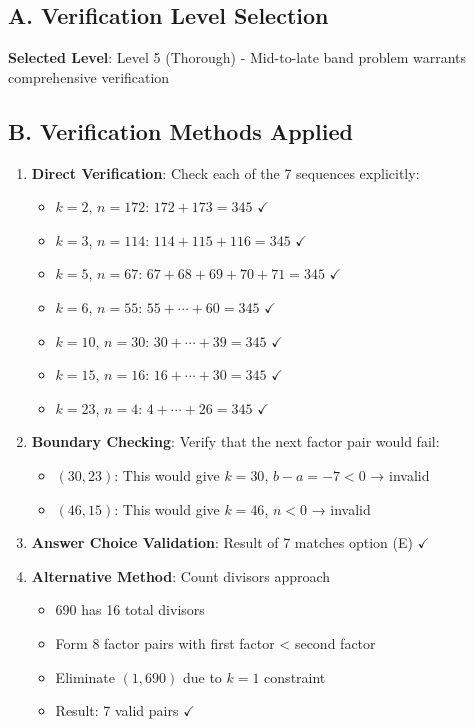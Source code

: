 \documentclass[11pt]{article}
\begin{document}
\begin{verificationbox}
\subsection*{A. Verification Level Selection}
\textbf{Selected Level}: Level 5 (Thorough) - Mid-to-late band problem warrants comprehensive verification

\subsection*{B. Verification Methods Applied}
\begin{enumerate}[leftmargin=*]
    \item \textbf{Direct Verification}: Check each of the 7 sequences explicitly:
    \begin{itemize}
        \item $k=2$, $n=172$: $172 + 173 = 345$ $\checkmark$
        \item $k=3$, $n=114$: $114 + 115 + 116 = 345$ $\checkmark$
        \item $k=5$, $n=67$: $67 + 68 + 69 + 70 + 71 = 345$ $\checkmark$
        \item $k=6$, $n=55$: $55 + \cdots + 60 = 345$ $\checkmark$
        \item $k=10$, $n=30$: $30 + \cdots + 39 = 345$ $\checkmark$
        \item $k=15$, $n=16$: $16 + \cdots + 30 = 345$ $\checkmark$
        \item $k=23$, $n=4$: $4 + \cdots + 26 = 345$ $\checkmark$
    \end{itemize}
    
    \item \textbf{Boundary Checking}: Verify that the next factor pair would fail:
    \begin{itemize}
        \item $(30, 23)$: This would give $k=30$, $b-a = -7 < 0$ → invalid
        \item $(46, 15)$: This would give $k=46$, $n < 0$ → invalid
    \end{itemize}
    
    \item \textbf{Answer Choice Validation}: Result of 7 matches option (E) $\checkmark$
    
    \item \textbf{Alternative Method}: Count divisors approach
    \begin{itemize}
        \item 690 has 16 total divisors
        \item Form 8 factor pairs with first factor < second factor
        \item Eliminate $(1, 690)$ due to $k=1$ constraint
        \item Result: 7 valid pairs $\checkmark$
    \end{itemize}
\end{enumerate}


\end{verificationbox}
\end{document}
